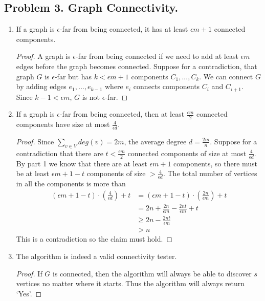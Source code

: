 \documentclass[11pt]{article}
\begin{document}
\subsection*{Problem 3. Graph Connectivity.}
\begin{enumerate}
\item If a graph is $\epsilon$-far from being connected, it has at least $\epsilon m+1$ connected components.
\begin{proof}
A graph is $\epsilon$-far from being connected if we need to add at least $\epsilon m$ edges before the graph becomes connected. Suppose for a contradiction, that graph $G$ is $\epsilon$-far but has $k < \epsilon m + 1$ components $C_1, ..., C_k$. We can connect $G$ by adding edges $e_1, ..., e_{k-1}$ where $e_i$ connects components $C_{i}$ and $C_{i+1}$. Since $k-1 < \epsilon m$, $G$ is not $\epsilon$-far.
\end{proof}
\item If a graph is $\epsilon$-far from being connected, then at least $\frac{\epsilon m}{2}$ connected components have size at most $\frac{4}{\epsilon d}$.
\begin{proof}
Since $\sum_{v \in V} deg(v) = 2m$, the average degree $d=\frac{2m}{n}$. Suppose for a contradiction that there are $t < \frac{\epsilon m}{2}$ connected components of size at most $\frac{4}{\epsilon d}$. By part 1 we know that there are at least $\epsilon m + 1$ components, so there must be at least $\epsilon m + 1 - t$ components of size $> \frac{4}{\epsilon d}$. The total number of vertices in all the components is more than
\begin{align*}
\left( \epsilon m + 1 - t \right)\cdot\left(\frac{4}{\epsilon d}\right) + t &= \left( \epsilon m + 1 - t \right)\cdot\left(\frac{2n}{\epsilon m}\right) + t\\
&= 2n + \frac{2n}{\epsilon m} - \frac{2nt}{\epsilon m} + t\\
&\geq 2n - \frac{2nt}{\epsilon m}\\
&> n
\end{align*}
This is a contradiction so the claim must hold.
\end{proof}
\item The algorithm is indeed a valid connectivity tester.
\begin{proof}
If $G$ is connected, then the algorithm will always be able to discover $s$ vertices no matter where it starts. Thus the algorithm will always return `Yes'. 


\end{proof}
\end{enumerate}
\end{document}
